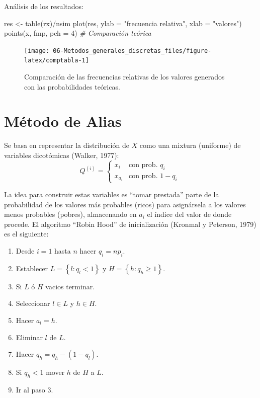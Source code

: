 \documentclass[
]{book}
\newenvironment{Shaded}{\begin{snugshade}}{\end{snugshade}}
\newcommand{\AttributeTok}[1]{\textcolor[rgb]{0.77,0.63,0.00}{#1}}
\newcommand{\CommentTok}[1]{\textcolor[rgb]{0.56,0.35,0.01}{\textit{#1}}}
\newcommand{\DecValTok}[1]{\textcolor[rgb]{0.00,0.00,0.81}{#1}}
\newcommand{\FunctionTok}[1]{\textcolor[rgb]{0.00,0.00,0.00}{#1}}
\newcommand{\NormalTok}[1]{#1}
\newcommand{\OtherTok}[1]{\textcolor[rgb]{0.56,0.35,0.01}{#1}}
\newcommand{\SpecialCharTok}[1]{\textcolor[rgb]{0.00,0.00,0.00}{#1}}
\newcommand{\StringTok}[1]{\textcolor[rgb]{0.31,0.60,0.02}{#1}}
\theoremstyle{break}
\theoremstyle{definition}
\theoremstyle{definition}
\theoremstyle{definition}
\theoremstyle{definition}
\theoremstyle{remark}
\begin{document}
Análisis de los resultados:

\begin{Shaded}
\begin{Highlighting}[]
\NormalTok{res }\OtherTok{\textless{}{-}} \FunctionTok{table}\NormalTok{(rx)}\SpecialCharTok{/}\NormalTok{nsim}
\FunctionTok{plot}\NormalTok{(res, }\AttributeTok{ylab =} \StringTok{"frecuencia relativa"}\NormalTok{, }\AttributeTok{xlab =} \StringTok{"valores"}\NormalTok{)}
\FunctionTok{points}\NormalTok{(x, fmp, }\AttributeTok{pch =} \DecValTok{4}\NormalTok{)  }\CommentTok{\# Comparación teórica}
\end{Highlighting}
\end{Shaded}

\begin{figure}[!htb]

{\centering \texttt{[image: 06-Metodos\_generales\_discretas\_files/figure-latex/comptabla-1]} 

}

\caption{Comparación de las frecuencias relativas de los valores generados con las probabilidades teóricas.}\label{fig:comptabla}
\end{figure}

\hypertarget{alias}{%
\section{Método de Alias}\label{alias}}

Se basa en representar la distribución de \(X\) como una mixtura
(uniforme) de variables dicotómicas (Walker, 1977):
\[Q^{(i)}=\left\{ 
\begin{array}{ll}
x_{i} & \text{con prob. } q_{i} \\ 
x_{a_{i}} & \text{con prob. } 1-q_{i}
\end{array}
\ \right.\]

La idea para construir estas variables es ``tomar prestada'' parte de la probabilidad de los valores más probables (ricos) para asignársela a los valores menos probables (pobres), almacenando en \(a_i\) el índice del valor de donde procede.
El algoritmo ``Robin Hood'' de inicialización (Kronmal y Peterson, 1979) es el siguiente:

\begin{enumerate}
\def\labelenumi{\arabic{enumi}.}
\item
  Desde \(i=1\) hasta \(n\) hacer \(q_{i}=np_{i}\).
\item
  Establecer \(L=\left\{ l:q_{l}<1\right\}\) y
  \(H=\left\{ h:q_{h}\geq 1\right\}\).
\item
  Si \(L\) ó \(H\) vacios terminar.
\item
  Seleccionar \(l\in L\) y \(h\in H\).
\item
  Hacer \(a_{l}=h\).
\item
  Eliminar \(l\) de \(L\).
\item
  Hacer \(q_{h}=q_{h}-\left( 1-q_{l}\right)\).
\item
  Si \(q_{h}<1\) mover \(h\) de \(H\) a \(L\).
\item
  Ir al paso 3.
\end{enumerate}
\end{document}

